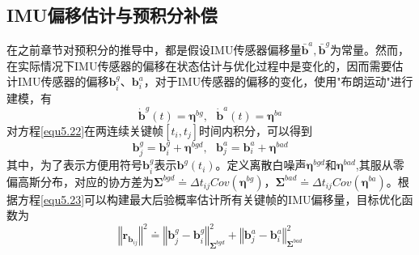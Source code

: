 \subsection{IMU偏移估计与预积分补偿}
在之前章节对预积分的推导中，都是假设IMU传感器偏移量${\bar{\boldsymbol{b}}^a, \bar{\boldsymbol{b}}^g}$为常量。然而，在实际情况下IMU传感器的偏移在状态估计与优化过程中是变化的，因而需要估计IMU传感器的偏移$\boldsymbol{b}_i^g$、$\boldsymbol{b}_i^a$，对于IMU传感器的偏移的变化，使用"布朗运动"进行建模，有
\begin{equation}
\label{equ5.22}
\dot{\boldsymbol{b}}^g(t) = \boldsymbol{\eta}^{bg}, \ \ \ \dot{\boldsymbol{b}}^a(t) = \boldsymbol{\eta}^{ba}
\end{equation}
对方程\eqref{equ5.22}在两连续关键帧$[t_i,t_j]$时间内积分，可以得到
\begin{equation}
\label{equ5.23}
\boldsymbol{b}_j^g = \boldsymbol{b}_i^g+\boldsymbol{\eta}^{bgd}, \ \ \ \boldsymbol{b}_j^a = \boldsymbol{b}_i^a+\boldsymbol{\eta}^{bad}
\end{equation}
其中，为了表示方便用符号$\boldsymbol{b}_i^g$表示$\boldsymbol{b}^g(t_i)$。定义离散白噪声$\boldsymbol{\eta}^{bgd}$和$\boldsymbol{\eta}^{bad}$,其服从零偏高斯分布，对应的协方差为$\boldsymbol{\Sigma}^{bgd} \doteq \Delta t_{ij} Cov(\boldsymbol{\eta}^{bg}) $，$\boldsymbol{\Sigma}^{bad} \doteq \Delta t_{ij} Cov(\boldsymbol{\eta}^{ba})$。根据方程\eqref{equ5.23}可以构建最大后验概率估计所有关键帧的IMU偏移量，目标优化函数为
\begin{equation}
\label{equ5.24}
\left\Vert \boldsymbol{r}_{\boldsymbol{b}_{ij}} \right\Vert ^2 \doteq \left\Vert \boldsymbol{b}_j^g -\boldsymbol{b}_i^g \right\Vert_{\boldsymbol{\Sigma}^{bgd}}^2 + \left\Vert \boldsymbol{b}_j^a -\boldsymbol{b}_i^a \right\Vert_{\boldsymbol{\Sigma}^{bad}}^2
\end{equation}

